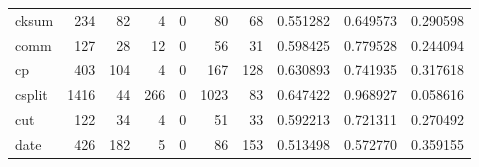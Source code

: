 \begin{longtable}{lrrrrrrrrr}
cksum     &                                                234 &                                                 82 &                                                  4 &                                                  0 &                                                 80 &                                                 68 &                                           0.551282 &                               0.649573 &                             0.290598 \\
comm      &                                                127 &                                                 28 &                                                 12 &                                                  0 &                                                 56 &                                                 31 &                                           0.598425 &                               0.779528 &                             0.244094 \\
cp        &                                                403 &                                                104 &                                                  4 &                                                  0 &                                                167 &                                                128 &                                           0.630893 &                               0.741935 &                             0.317618 \\
csplit    &                                               1416 &                                                 44 &                                                266 &                                                  0 &                                               1023 &                                                 83 &                                           0.647422 &                               0.968927 &                             0.058616 \\
cut       &                                                122 &                                                 34 &                                                  4 &                                                  0 &                                                 51 &                                                 33 &                                           0.592213 &                               0.721311 &                             0.270492 \\
date      &                                                426 &                                                182 &                                                  5 &                                                  0 &                                                 86 &                                                153 &                                           0.513498 &                               0.572770 &                             0.359155 \\

\end{longtable}
